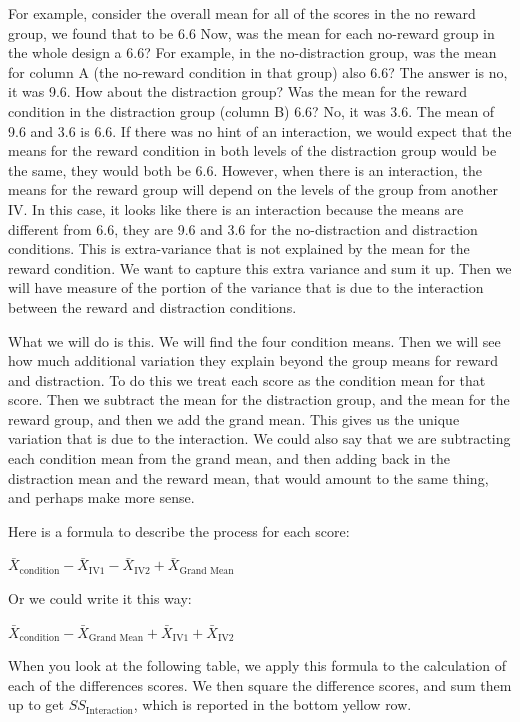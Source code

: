 \documentclass[]{book}
\begin{document}
For example, consider the overall mean for all of the scores in the no reward group, we found that to be 6.6 Now, was the mean for each no-reward group in the whole design a 6.6? For example, in the no-distraction group, was the mean for column A (the no-reward condition in that group) also 6.6? The answer is no, it was 9.6. How about the distraction group? Was the mean for the reward condition in the distraction group (column B) 6.6? No, it was 3.6. The mean of 9.6 and 3.6 is 6.6. If there was no hint of an interaction, we would expect that the means for the reward condition in both levels of the distraction group would be the same, they would both be 6.6. However, when there is an interaction, the means for the reward group will depend on the levels of the group from another IV. In this case, it looks like there is an interaction because the means are different from 6.6, they are 9.6 and 3.6 for the no-distraction and distraction conditions. This is extra-variance that is not explained by the mean for the reward condition. We want to capture this extra variance and sum it up. Then we will have measure of the portion of the variance that is due to the interaction between the reward and distraction conditions.

What we will do is this. We will find the four condition means. Then we will see how much additional variation they explain beyond the group means for reward and distraction. To do this we treat each score as the condition mean for that score. Then we subtract the mean for the distraction group, and the mean for the reward group, and then we add the grand mean. This gives us the unique variation that is due to the interaction. We could also say that we are subtracting each condition mean from the grand mean, and then adding back in the distraction mean and the reward mean, that would amount to the same thing, and perhaps make more sense.

Here is a formula to describe the process for each score:

\(\bar{X}_\text{condition} -\bar{X}_\text{IV1} - \bar{X}_\text{IV2} + \bar{X}_\text{Grand Mean}\)

Or we could write it this way:

\(\bar{X}_\text{condition} - \bar{X}_\text{Grand Mean} + \bar{X}_\text{IV1} + \bar{X}_\text{IV2}\)

When you look at the following table, we apply this formula to the calculation of each of the differences scores. We then square the difference scores, and sum them up to get \(SS_\text{Interaction}\), which is reported in the bottom yellow row.
\end{document}

